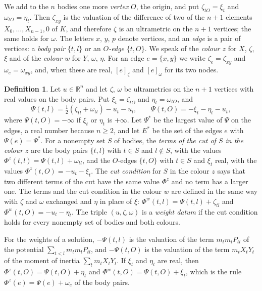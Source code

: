 \documentclass[11pt]{amsart}
\theoremstyle{definition}
\newtheorem{definition}[theorem]{Definition}
\theoremstyle{remark}
\numberwithin{equation}{section}
\newcommand{\RR}{\mathbb{R}}
\newcommand{\Ps}{\Psi^{*}}
\newcommand{\Es}{E^{*}}
\newcommand{\nd}[2]{[#1]_{#2}}
\begin{document}
We add to the $n$ bodies one more \emph{vertex} $O$, the origin, and put $\zeta_{tO} = \xi_t$ and
$\omega_{tO} = \eta_t$. Then $\zeta_{xy}$ is the valuation of the difference of two of the $n + 1$
elements $X_0, \dots, X_{n-1}, 0$ of $K$, and therefore $\zeta$ is an ultrametric on the $n + 1$
vertices; the same holds for $\omega$. The letters $x$, $y$, $p$ denote vertices, and an \emph{edge} is
a pair of vertices: a \emph{body pair} $\{t, l\}$ or an \emph{$O$-edge} $\{t, O\}$. We speak of the
\emph{colour $z$} for $X$, $\zeta$, $\xi$ and of the \emph{colour $w$} for $Y$, $\omega$, $\eta$. For an
edge $e = \{x, y\}$ we write $\zeta_e = \zeta_{xy}$ and $\omega_e = \omega_{xy}$, and, when these are
real, $\nd{e}{\zeta}$ and $\nd{e}{\omega}$ for its two nodes.

\begin{definition}\label{def:psi}
Let $u \in \RR^n$ and let $\zeta$, $\omega$ be ultrametrics on the $n + 1$ vertices with real values on
the body pairs. Put $\xi_t = \zeta_{tO}$ and $\eta_t = \omega_{tO}$, and
\[
  \Psi(t, l) = \tfrac12 (\zeta_{tl} + \omega_{tl}) - u_t - u_l, \qquad
  \Psi(t, O) = -\xi_t - \eta_t - u_t ,
\]
where $\Psi(t, O) = -\infty$ if $\xi_t$ or $\eta_t$ is $+\infty$. Let $\Ps$ be the largest value of
$\Psi$ on the edges, a real number because $n \ge 2$, and let $\Es$ be the set of the edges $e$ with
$\Psi(e) = \Ps$. For a nonempty set $S$ of bodies, the \emph{terms of the cut of $S$ in the colour $z$}
are the body pairs $\{t, l\}$ with $t \in S$ and $l \notin S$, with the values
$\Phi^z(t, l) = \Psi(t, l) + \omega_{tl}$, and the $O$-edges $\{t, O\}$ with $t \in S$ and $\xi_t$ real,
with the values $\Phi^z(t, O) = -u_t - \xi_t$. The \emph{cut condition} for $S$ in the colour $z$ says
that two different terms of the cut have the same value $\Phi^z$ and no term has a larger one. The terms
and the cut condition in the colour $w$ are defined in the same way with $\zeta$ and $\omega$ exchanged
and $\eta$ in place of $\xi$: $\Phi^w(t, l) = \Psi(t, l) + \zeta_{tl}$ and $\Phi^w(t, O) = -u_t - \eta_t$.
The triple $(u, \zeta, \omega)$ is a \emph{weight datum} if the cut condition holds for every nonempty
set of bodies and both colours.
\end{definition}

For the weights of a solution, $-\Psi(t, l)$ is the valuation of the term $m_t m_l P_{tl}$ of the
potential $\sum_{t < l} m_t m_l P_{tl}$, and $-\Psi(t, O)$ is the valuation of the term $m_t X_t Y_t$ of
the moment of inertia $\sum_t m_t X_t Y_t$. If $\xi_t$ and $\eta_t$ are real, then
$\Phi^z(t, O) = \Psi(t, O) + \eta_t$ and $\Phi^w(t, O) = \Psi(t, O) + \xi_t$, which is the rule
$\Phi^z(e) = \Psi(e) + \omega_e$ of the body pairs.
\end{document}
